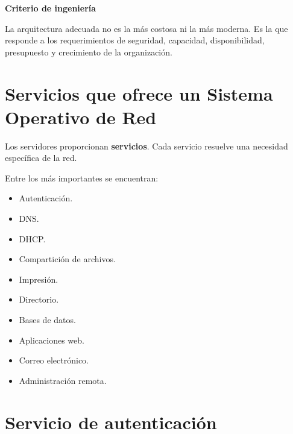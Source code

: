 \documentclass[
  spanish,
  letterpaper,
]{scrbook}
\providecommand{\tightlist}{%
  \setlength{\itemsep}{0pt}\setlength{\parskip}{0pt}}
\begin{document}
\begin{tcolorbox}[enhanced jigsaw, arc=.35mm, bottomrule=.15mm, breakable, colback=white, colframe=quarto-callout-tip-color-frame, left=2mm, leftrule=.75mm, opacityback=0, rightrule=.15mm, toprule=.15mm]
\begin{minipage}[t]{5.5mm}
\textcolor{quarto-callout-tip-color}{\faLightbulb}
\end{minipage}%
\begin{minipage}[t]{\textwidth - 5.5mm}

\vspace{-3mm}\textbf{Criterio de ingeniería}\vspace{3mm}

La arquitectura adecuada no es la más costosa ni la más moderna. Es la
que responde a los requerimientos de seguridad, capacidad,
disponibilidad, presupuesto y crecimiento de la organización.

\end{minipage}%
\end{tcolorbox}


\chapter{Servicios que ofrece un Sistema Operativo de
Red}\label{servicios-que-ofrece-un-sistema-operativo-de-red}

Los servidores proporcionan \textbf{servicios}. Cada servicio resuelve
una necesidad específica de la red.

Entre los más importantes se encuentran:

\begin{itemize}
\tightlist
\item
  Autenticación.
\item
  DNS.
\item
  DHCP.
\item
  Compartición de archivos.
\item
  Impresión.
\item
  Directorio.
\item
  Bases de datos.
\item
  Aplicaciones web.
\item
  Correo electrónico.
\item
  Administración remota.
\end{itemize}


\chapter{Servicio de autenticación}\label{servicio-de-autenticaciuxf3n}
\end{document}
